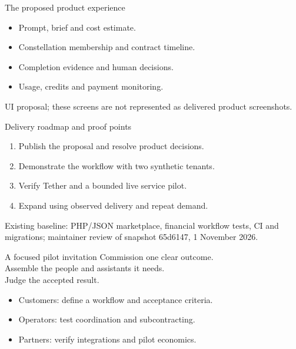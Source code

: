 \documentclass[aspectratio=169,20pt]{beamer}
\newcommand{\Sources}[1]{\par\vfill{\fontsize{14}{18}\selectfont\color{gray}#1\par}}
\begin{document}
\begin{frame}{The proposed product experience}
\begin{itemize}
\item Prompt, brief and cost estimate.
\item Constellation membership and contract timeline.
\item Completion evidence and human decisions.
\item Usage, credits and payment monitoring.
\end{itemize}
\Sources{UI proposal; these screens are not represented as delivered product screenshots.}
\end{frame}
\begin{frame}{Delivery roadmap and proof points}
\begin{enumerate}
\item Publish the proposal and resolve product decisions.
\item Demonstrate the workflow with two synthetic tenants.
\item Verify Tether and a bounded live service pilot.
\item Expand using observed delivery and repeat demand.
\end{enumerate}
\Sources{Existing baseline: PHP/JSON marketplace, financial workflow tests, CI and migrations; maintainer review of snapshot 65d6147, 1 November 2026.}
\end{frame}
\begin{frame}{A focused pilot invitation}
{\fontsize{30}{38}\selectfont Commission one clear outcome.\\Assemble the people and assistants it needs.\\Judge the accepted result.}\par\vspace{7mm}
\begin{itemize}
\item Customers: define a workflow and acceptance criteria.
\item Operators: test coordination and subcontracting.
\item Partners: verify integrations and pilot economics.
\end{itemize}
\end{frame}
\end{document}
